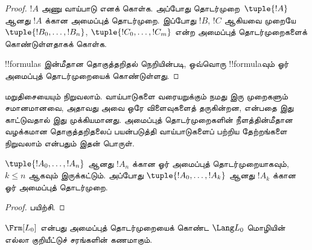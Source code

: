 \documentclass[../../../include/open-logic-section]{subfiles}
\begin{document}
\begin{proof}
$!A$ அணு வாய்பாடு எனக் கொள்க. அப்போது தொடர்முறை~$\tuple{!A}$ ஆனது
$!A$ க்கான அமைப்புத் தொடர்முறை.
%
இப்போது $!B$, $!C$ ஆகியவை முறையே $\tuple{!B_0,\dotsc,!B_n}$,
$\tuple{!C_0,\dotsc,!C_m}$ என்ற அமைப்புத் தொடர்முறைகளைக் கொண்டுள்ளதாகக்
கொள்க.
%
\begin{enumerate}
\end{enumerate}
!!{formula}s இன்மீதான தொகுத்தறிதல் நெறியின்படி, ஒவ்வொரு !!{formula}வும்
ஓர் அமைப்புத் தொடர்முறையைக் கொண்டுள்ளது.
\end{proof}

மறுதிசையையும் நிறுவலாம். வாய்பாடுகளை வரையறுக்கும் நமது இரு முறைகளும்
சமானமானவை, அதாவது அவை ஒரே விளைவுகளைத் தருகின்றன, என்பதை இது காட்டுவதால்
இது முக்கியமானது. அமைப்புத் தொடர்முறைகளின் நீளத்தின்மீதான வழக்கமான
தொகுத்தறிதலைப் பயன்படுத்தி வாய்பாடுகளைப் பற்றிய தேற்றங்களை நிறுவலாம்
என்பதும் இதன் பொருள்.

\begin{lem}
$\tuple{!A_0,\dotsc,!A_n}$ ஆனது $!A_n$ க்கான ஓர் அமைப்புத்
தொடர்முறையாகவும், $k \leq n$ ஆகவும் இருக்கட்டும். அப்போது
$\tuple{!A_0,\dotsc,!A_k}$ ஆனது $!A_k$ க்கான ஓர் அமைப்புத் தொடர்முறை.
\end{lem}

\begin{proof}
பயிற்சி.
\end{proof}

\begin{thm}
$\Frm[L_0]$ என்பது அமைப்புத் தொடர்முறையைக் கொண்ட $\Lang L_0$ மொழியின்
எல்லா குறியீட்டுச் சரங்களின் கணமாகும்.
\end{thm}
\end{document}
